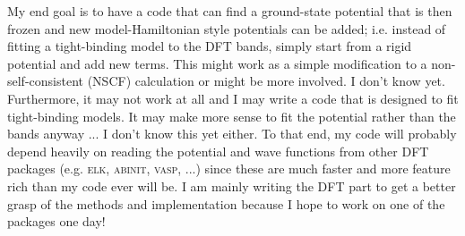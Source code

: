 \documentclass[prb,aps,11pt,superscriptaddress,floatfix]{revtex4-2}
\begin{document}
My end goal is to have a code that can find a ground-state potential that is then frozen and new model-Hamiltonian style potentials can be added; i.e. instead of fitting a tight-binding model to the DFT bands, simply start from a rigid potential and add new terms. This might work as a simple modification to a non-self-consistent (NSCF) calculation or might be more involved. I don't know yet. Furthermore, it may not work at all and I may write a code that is designed to fit tight-binding models. It may make more sense to fit the potential rather than the bands anyway ... I don't know this yet either. To that end, my code will probably depend heavily on reading the potential and wave functions from other DFT packages (e.g. \textsc{elk}, \textsc{abinit}, \textsc{vasp}, ...) since these are much faster and more feature rich than my code ever will be. I am mainly writing the DFT part to get a better grasp of the methods and implementation because I hope to work on one of the packages one day!
\end{document}
